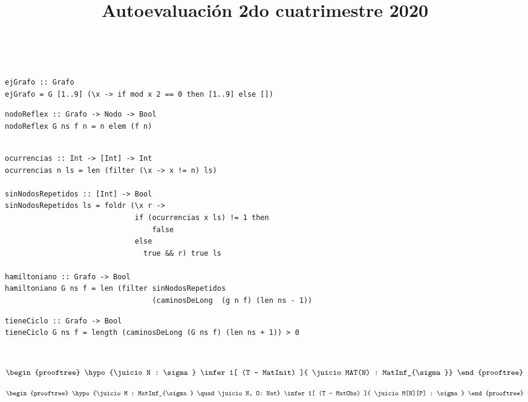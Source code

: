\documentclass[leqno, 12pt, twoside, letterpaper]{book}
\date{\vspace{-5ex}}
\title{Autoevaluación 2do cuatrimestre 2020}
\begin{document}
\maketitle
\tableofcontents

\newpage

\\


\begin{verbatim}
ejGrafo :: Grafo
ejGrafo = G [1..9] (\x -> if mod x 2 == 0 then [1..9] else [])
\end{verbatim}

\begin{verbatim}
nodoReflex :: Grafo -> Nodo -> Bool
nodoReflex G ns f n = n elem (f n)
\end{verbatim}

\begin{verbatim}

ocurrencias :: Int -> [Int] -> Int
ocurrencias n ls = len (filter (\x -> x != n) ls)

sinNodosRepetidos :: [Int] -> Bool
sinNodosRepetidos ls = foldr (\x r ->
                              if (ocurrencias x ls) != 1 then
                                  false
                              else
                                true && r) true ls

hamiltoniano :: Grafo -> Bool
hamiltoniano G ns f = len (filter sinNodosRepetidos
                                  (caminosDeLong  (g n f) (len ns - 1))
\end{verbatim}

\begin{verbatim}
tieneCiclo :: Grafo -> Bool
tieneCiclo G ns f = length (caminosDeLong (G ns f) (len ns + 1)) > 0
\end{verbatim}

\newpage

\\


\[
\begin{prooftree}
    \hypo{\juicio N : \sigma}
    \infer1[ (T - MatInit) ]{ \juicio MAT(N) : MatInf_{\sigma}}
\end{prooftree}
\]

\hfill

\[
\begin{prooftree}
    \hypo{\juicio M : MatInf_{\sigma} \quad  \juicio N, O: Nat}
    \infer1[ (T - MatObs) ]{ \juicio M[N][P] : \sigma}
\end{prooftree}
\]
\end{document}
